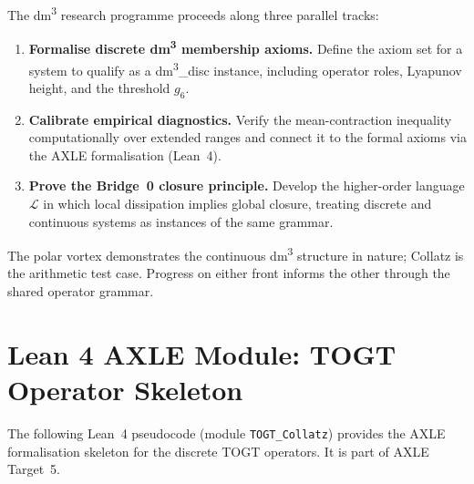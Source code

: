 \documentclass[11pt,a4paper]{article}
\theoremstyle{definition}
\theoremstyle{plain}
\begin{document}
The dm\textsuperscript{3} research programme proceeds along three parallel tracks:

\begin{enumerate}
  \item \textbf{Formalise discrete dm\textsuperscript{3} membership axioms.}
        Define the axiom set for a system to qualify as a dm\textsuperscript{3}\_disc instance,
        including operator roles, Lyapunov height, and the threshold $g_6$.
  \item \textbf{Calibrate empirical diagnostics.}
        Verify the mean-contraction inequality computationally over extended ranges and
        connect it to the formal axioms via the AXLE formalisation (Lean~4).
  \item \textbf{Prove the Bridge~0 closure principle.}
        Develop the higher-order language $\mathcal{L}$ in which local dissipation implies
        global closure, treating discrete and continuous systems as instances of the same grammar.
\end{enumerate}

The polar vortex demonstrates the continuous dm\textsuperscript{3} structure in nature; Collatz
is the arithmetic test case. Progress on either front informs the other through the shared
operator grammar.

\appendix
\section{Lean 4 AXLE Module: TOGT Operator Skeleton}
\label{app:lean}

The following Lean~4 pseudocode (module \texttt{TOGT\_Collatz}) provides the AXLE
formalisation skeleton for the discrete TOGT operators. It is part of AXLE Target~5.
\end{document}
